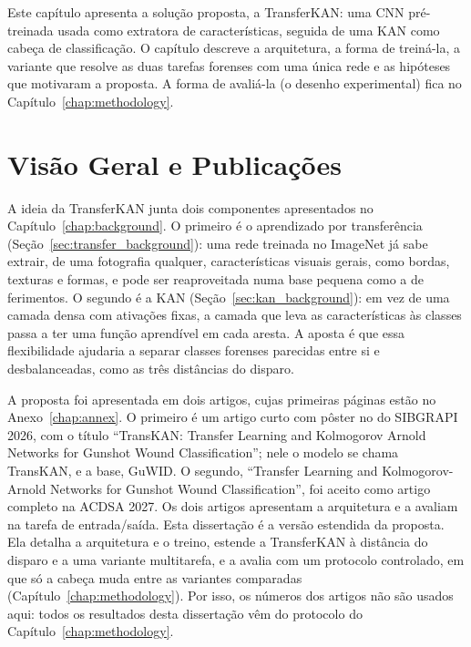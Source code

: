 \label{chap:solution}

Este capítulo apresenta a solução proposta, a TransferKAN: uma \gls{CNN} pré-treinada usada como extratora de características, seguida de uma \gls{KAN} como cabeça de classificação. O capítulo descreve a arquitetura, a forma de treiná-la, a variante que resolve as duas tarefas forenses com uma única rede e as hipóteses que motivaram a proposta. A forma de avaliá-la (o desenho experimental) fica no Capítulo~\ref{chap:methodology}.

\section{Visão Geral e Publicações}
\label{sec:transferkan_overview}

A ideia da TransferKAN junta dois componentes apresentados no Capítulo~\ref{chap:background}. O primeiro é o aprendizado por transferência (Seção~\ref{sec:transfer_background}): uma rede treinada no ImageNet já sabe extrair, de uma fotografia qualquer, características visuais gerais, como bordas, texturas e formas, e pode ser reaproveitada numa base pequena como a de ferimentos. O segundo é a KAN (Seção~\ref{sec:kan_background}): em vez de uma camada densa com ativações fixas, a camada que leva as características às classes passa a ter uma função aprendível em cada aresta. A aposta é que essa flexibilidade ajudaria a separar classes forenses parecidas entre si e desbalanceadas, como as três distâncias do disparo.

A proposta foi apresentada em dois artigos, cujas primeiras páginas estão no Anexo~\ref{chap:annex}. O primeiro é um artigo curto com pôster no  do SIBGRAPI 2026, com o título ``TransKAN: Transfer Learning and Kolmogorov Arnold Networks for Gunshot Wound Classification''; nele o modelo se chama TransKAN, e a base, GuWID. O segundo, ``Transfer Learning and Kolmogorov-Arnold Networks for Gunshot Wound Classification'', foi aceito como artigo completo na ACDSA 2027. Os dois artigos apresentam a arquitetura e a avaliam na tarefa de entrada/saída. Esta dissertação é a versão estendida da proposta. Ela detalha a arquitetura e o treino, estende a TransferKAN à distância do disparo e a uma variante multitarefa, e a avalia com um protocolo controlado, em que só a cabeça muda entre as variantes comparadas (Capítulo~\ref{chap:methodology}). Por isso, os números dos artigos não são usados aqui: todos os resultados desta dissertação vêm do protocolo do Capítulo~\ref{chap:methodology}.

